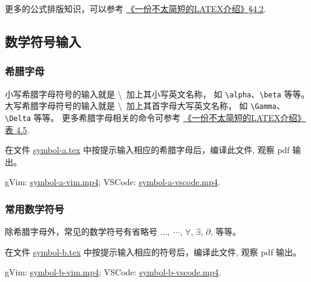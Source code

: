 \documentclass[
    11pt,
    base=hide,
    cite=authoryear,
    device=phone,
    lang=cn,
    mode=simple,
    result=answer,
    toc=onecol,
]{elegantbook_sierxue}
\begin{document}
更多的公式排版知识，可以参考 \hyperlink{books/lshort-zh-cn.pdf.51}%
{《一份不太简短的LATEX介绍》\S4.2}.

\subsection{数学符号输入}%
\label{sub:latex-math-symbol}

\subsubsection{希腊字母}%
\label{ssub:greek-letter}

小写希腊字母符号的输入就是 \textbackslash~加上其小写英文名称，
如 \lstinline{\alpha}、\lstinline{\beta} 等等。
大写希腊字母符号的输入就是 \textbackslash~加上其首字母大写英文名称，
如 \lstinline{\Gamma}、\lstinline{\Delta} 等等。
更多希腊字母相关的命令可参考
\hyperlink{books/lshort-zh-cn.pdf.66}%
{《一份不太简短的LATEX介绍》表 4.5}.
\begin{exercise}\label{ex:symbol-a}
    在文件
    \href{learn-latex/basic-03/symbol-a.tex}{symbol-a.tex}
    中按提示输入相应的希腊字母后，编译此文件, 观察 pdf 输出。
\end{exercise}
\begin{cast}\label{cast:symbol-a}
    gVim: \href{media/casts/symbol-a-vim.mp4}{symbol-a-vim.mp4};
    VSCode: \href{media/casts/symbol-a-vscode.mp4}{symbol-a-vscode.mp4}.
\end{cast}

\subsubsection{常用数学符号}%
\label{ssub:math-gneral}

除希腊字母外，常见的数学符号有省略号 \(\dots,\;\cdots\), \(\forall\),
\(\exists\), \(\partial\), 等等。
\begin{exercise}\label{ex:symbol-b}
    在文件
    \href{learn-latex/basic-03/symbol-b.tex}{symbol-b.tex}
    中按提示输入相应的符号后，编译此文件, 观察 pdf 输出。
\end{exercise}
\begin{cast}\label{cast:symbol-b}
    gVim: \href{media/casts/symbol-b-vim.mp4}{symbol-b-vim.mp4};
    VSCode: \href{media/casts/symbol-b-vscode.mp4}{symbol-b-vscode.mp4}.
\end{cast}
\end{document}
